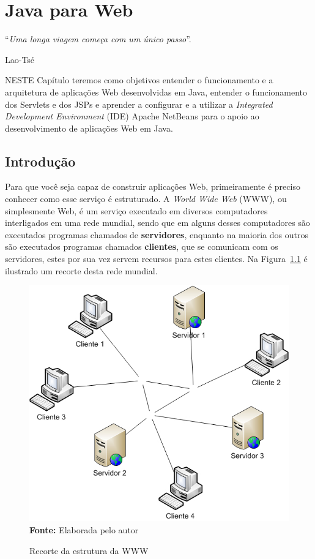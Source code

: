 \chapter{Java para Web}\label{cap:javaParaWeb}
\epigraph{``\textit{Uma longa viagem começa com um único passo}''.}{Lao-Tsé}

\lettrine[lines=4, lhang=0.1, lraise=0, loversize=0.2, findent=0.1em]{\textcolor{corAzulTema}{N}}{ESTE} Capítulo teremos como objetivos entender o funcionamento e a arquitetura de aplicações Web desenvolvidas em Java, entender o funcionamento dos Servlets e dos JSPs e aprender a configurar e a utilizar a \textit{Integrated Development Environment} (IDE) Apache NetBeans para o apoio ao desenvolvimento de aplicações Web em Java.


\section{Introdução}

Para que você seja capaz de construir aplicações Web, primeiramente é preciso conhecer como esse serviço é estruturado. A \textit{World Wide Web} (WWW), ou simplesmente Web, é um serviço executado em diversos computadores interligados em uma rede mundial, sendo que em alguns desses computadores são executados programas chamados de \textbf{servidores}, enquanto na maioria dos outros são executados programas chamados \textbf{clientes}, que se comunicam com os servidores, estes por sua vez servem recursos para estes clientes. Na Figura~\ref{fig:cap01ClienteServidor} é ilustrado um recorte desta rede mundial.

\FloatBarrier
\begin{figure}[!htbp]
    \centering
    \caption{Recorte da estrutura da WWW}
    \includegraphics[scale=0.6]{imagens/cap01ClienteServidor}
    \\\textbf{Fonte:} Elaborada pelo autor
    \label{fig:cap01ClienteServidor}
\end{figure}
\FloatBarrier


